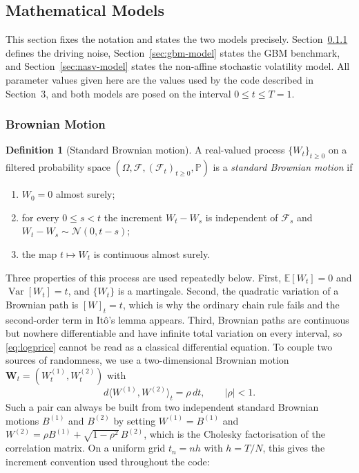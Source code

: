 \documentclass[11pt,a4paper]{article}
\theoremstyle{definition}
\newtheorem{definition}[theorem]{Definition}
\theoremstyle{remark}
\begin{document}
\subsection{Mathematical Models}
\label{sec:models}
This section fixes the notation and states the two models precisely. Section~\ref{sec:bm} defines the driving noise, Section~\ref{sec:gbm-model} states the GBM benchmark, and Section~\ref{sec:nasv-model} states the non-affine stochastic volatility model. All parameter values given here are the values used by the code described in Section~3, and both models are posed on the interval $0 \le t \le T = 1$.
\subsubsection{Brownian Motion}
\label{sec:bm}
\begin{definition}[Standard Brownian motion]
\label{def:bm}
A real-valued process $\{W_t\}_{t \ge 0}$ on a filtered probability space $(\Omega, \mathcal{F}, (\mathcal{F}_t)_{t \ge 0}, \mathbb{P})$ is a \emph{standard Brownian motion} if
\begin{enumerate}[label=(\roman*), leftmargin=2em]
    \item $W_0 = 0$ almost surely;
    \item for every $0 \le s < t$ the increment $W_t - W_s$ is independent of $\mathcal{F}_s$ and $W_t - W_s \sim \mathcal{N}(0, t - s)$;
    \item the map $t \mapsto W_t$ is continuous almost surely.
\end{enumerate}
\end{definition}
Three properties of this process are used repeatedly below. First, $\mathbb{E}[W_t] = 0$ and $\operatorname{Var}[W_t] = t$, and $\{W_t\}$ is a martingale. Second, the quadratic variation of a Brownian path is $[W]_t = t$, which is why the ordinary chain rule fails and the second-order term in It\^o's lemma appears. Third, Brownian paths are continuous but nowhere differentiable and have infinite total variation on every interval, so \eqref{eq:logprice} cannot be read as a classical differential equation.
To couple two sources of randomness, we use a two-dimensional Brownian motion $\bm{W}_t = (W_t^{(1)}, W_t^{(2)})$ with
\begin{equation}
    d\langle W^{(1)}, W^{(2)} \rangle_t = \rho\, dt,
    \qquad |\rho| < 1 .
    \label{eq:correlation}
\end{equation}
Such a pair can always be built from two independent standard Brownian motions $B^{(1)}$ and $B^{(2)}$ by setting $W^{(1)} = B^{(1)}$ and $W^{(2)} = \rho B^{(1)} + \sqrt{1 - \rho^2}\, B^{(2)}$, which is the Cholesky factorisation of the correlation matrix. On a uniform grid $t_n = n h$ with $h = T / N$, this gives the increment convention used throughout the code:
\end{document}

